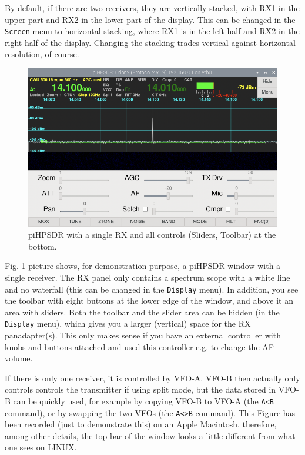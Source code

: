 \documentclass[12pt]{book}
\def\bltt#1{\texttt{\color{blue}#1}}
\def\pH{pi\-HPSDR\xspace}
\begin{document}
By default, if there are two receivers, they are vertically stacked,
with RX1 in the upper part and RX2 in the lower part of the display.
This can be changed in the \bltt{Screen} menu to horizontal stacking,
where RX1 is  in the left half and RX2 in the right half of  the
display. Changing the stacking trades vertical against horizontal
resolution, of course.

\begin{figure}[ht]
\center
\includegraphics[scale=0.45]{SingleReceiver.png}
\caption{\pH with a single RX and all controls (Sliders, Toolbar) at the  bottom.}
\label{fig:SingleReceiver}
\end{figure}

Fig. \ref{fig:SingleReceiver} picture shows, for demonstration purpose, a \pH
window with a single receiver.
The RX panel only contains a
spectrum scope with a white line and no waterfall (this can be changed in the
\bltt{Display} menu). In addition, you see the toolbar
with eight buttons at the lower edge of the window, and above
it an area with sliders. Both the toolbar and the slider area can be
hidden (in the \bltt{Display} menu), which gives you a larger (vertical) space
for the RX panadapter(s). This only makes sense if you have an external controller
with knobs and buttons attached and used this controller e.g. to change the
AF volume.

If there is only one receiver, it is controlled
by VFO-A. VFO-B then actually only controls controls the transmitter
if using split mode, but the data stored in VFO-B can
be quickly used, for example by copying VFO-B to VFO-A (the
\bltt{A<B} command), or by swapping the two VFOs (the \bltt{A<>B} command).
This Figure has been recorded (just to demonstrate this)
on an Apple Macintosh, therefore, among other details, the
top bar of the window looks a little different from what one sees
on LINUX.
\end{document}
